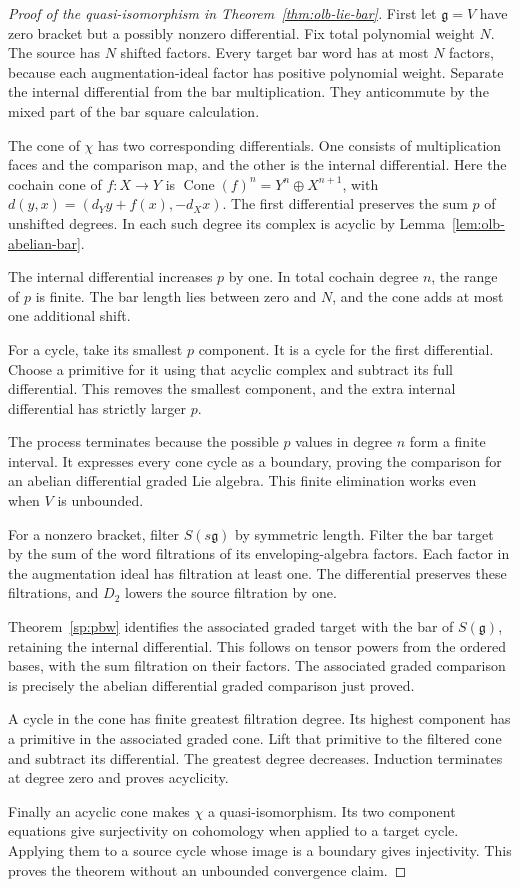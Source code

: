 \begin{proof}[Proof of the quasi-isomorphism in
Theorem~\ref{thm:olb-lie-bar}]
First let $\mathfrak g=V$ have zero bracket but a possibly
nonzero differential.  Fix total polynomial weight $N$.
The source has $N$ shifted factors.  Every target bar word has
at most $N$ factors, because each augmentation-ideal factor
has positive polynomial weight.
Separate the internal differential from the bar multiplication.
They anticommute by the mixed part of the bar square calculation.

The cone of $\chi$ has two corresponding differentials.
One consists of multiplication faces and the comparison map,
and the other is the internal differential.
Here the cochain cone of $f:X\to Y$ is
$\operatorname{Cone}(f)^n=Y^n\oplus X^{n+1}$, with
$d(y,x)=(d_Yy+f(x),-d_Xx)$.
The first differential preserves the sum $p$ of unshifted
degrees.  In each such degree its complex is acyclic by
Lemma~\ref{lem:olb-abelian-bar}.

The internal differential increases $p$ by one.
In total cochain degree $n$, the range of $p$ is finite.
The bar length lies between zero and $N$, and the cone adds
at most one additional shift.

For a cycle, take its smallest $p$ component.
It is a cycle for the first differential.
Choose a primitive for it using that acyclic complex and
subtract its full differential.
This removes the smallest component, and the extra internal
differential has strictly larger $p$.

The process terminates because the possible $p$ values in
degree $n$ form a finite interval.
It expresses every cone cycle as a boundary, proving the
comparison for an abelian differential graded Lie algebra.
This finite elimination works even when $V$ is unbounded.

For a nonzero bracket, filter $S(s\mathfrak g)$ by symmetric
length.  Filter the bar target by the sum of the word
filtrations of its enveloping-algebra factors.
Each factor in the augmentation ideal has filtration at
least one.  The differential preserves these filtrations,
and $D_2$ lowers the source filtration by one.

Theorem~\ref{sp:pbw} identifies the associated graded target
with the bar of $S(\mathfrak g)$, retaining the internal
differential.  This follows on tensor powers from the ordered
bases, with the sum filtration on their factors.
The associated graded comparison is precisely the abelian
differential graded comparison just proved.

A cycle in the cone has finite greatest filtration degree.
Its highest component has a primitive in the associated
graded cone.  Lift that primitive to the filtered cone and
subtract its differential.  The greatest degree decreases.
Induction terminates at degree zero and proves acyclicity.

Finally an acyclic cone makes $\chi$ a quasi-isomorphism.
Its two component equations give surjectivity on cohomology
when applied to a target cycle. Applying them to a source
cycle whose image is a boundary gives injectivity.
This proves the theorem without an unbounded convergence claim.
\end{proof}

